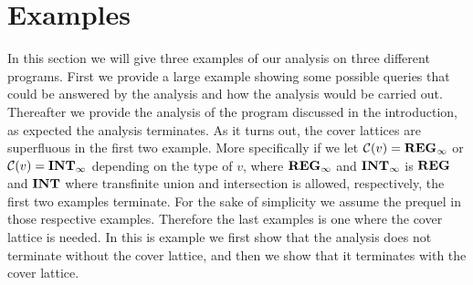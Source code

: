 \section{Examples}\label{sec:example}
In this section we will give three examples of our analysis on three different programs.
First we provide a large example showing some possible queries that could be answered by the analysis and how the analysis would be carried out.
Thereafter we provide the analysis of the program discussed in the introduction, as expected the analysis terminates.
As it turns out, the cover lattices are superfluous in the first two example.
More specifically if we let $\mathcal{C}(v) = \mathbf{REG}_{\infty}$ or $\mathcal{C}(v) = \mathbf{INT}_{\infty}$ depending on the type of $v$, where $\mathbf{REG}_{\infty}$ and $\mathbf{INT}_{\infty}$ is $\mathbf{REG}$ and $\mathbf{INT}$ where transfinite union and intersection is allowed, respectively, the first two examples terminate.
For the sake of simplicity we assume the prequel in those respective examples.
Therefore the last examples is one where the cover lattice is needed.
In this is example we first show that the analysis does not terminate without the cover lattice, and then we show that it terminates with the cover lattice.






